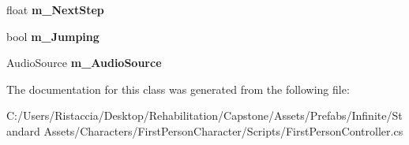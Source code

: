 \begin{DoxyCompactItemize}
\item 
\mbox{\label{class_unity_standard_assets_1_1_characters_1_1_first_person_1_1_first_person_controller_a91d03cb598889f30d9c50b09844e720f}} 
float {\bfseries m\+\_\+\+Next\+Step}
\item 
\mbox{\label{class_unity_standard_assets_1_1_characters_1_1_first_person_1_1_first_person_controller_a655d5c0c2884d6e7723fcb200fe9b59b}} 
bool {\bfseries m\+\_\+\+Jumping}
\item 
\mbox{\label{class_unity_standard_assets_1_1_characters_1_1_first_person_1_1_first_person_controller_afb939601838dac781cfbb35a57c0fcad}} 
Audio\+Source {\bfseries m\+\_\+\+Audio\+Source}
\end{DoxyCompactItemize}


The documentation for this class was generated from the following file\+:\begin{DoxyCompactItemize}
\item 
C\+:/\+Users/\+Ristaccia/\+Desktop/\+Rehabilitation/\+Capstone/\+Assets/\+Prefabs/\+Infinite/\+Standard Assets/\+Characters/\+First\+Person\+Character/\+Scripts/First\+Person\+Controller.\+cs\end{DoxyCompactItemize}
